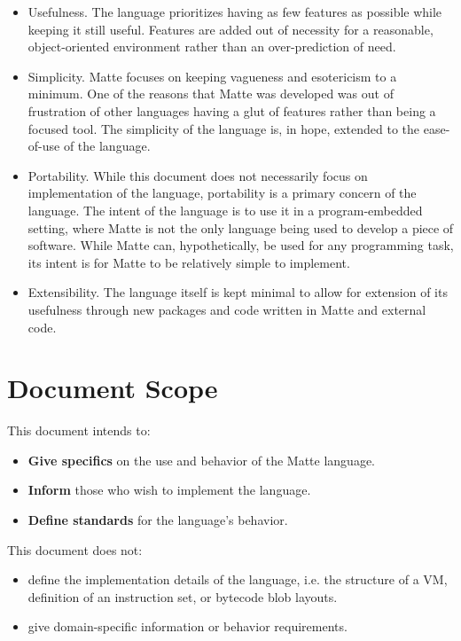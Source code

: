 \documentclass[12pt,letterpaper]{report}
\begin{document}
\begin{itemize}
\item Usefulness. The language prioritizes having as few features as possible 
  while keeping it still useful. Features are added out of necessity for a reasonable, 
  object-oriented environment rather than an over-prediction of need.

\item Simplicity. Matte focuses on keeping vagueness and esotericism to a minimum. One 
  of the reasons that Matte was developed was out of frustration of other 
  languages having a glut of features rather than being a focused tool. The 
  simplicity of the language is, in hope, extended to the ease-of-use of the language.

\item Portability. While this document does not necessarily focus on implementation 
  of the language, portability is a primary concern of the language. 
  The intent of the language is to use it in a program-embedded setting, 
  where Matte is not the only language being used to develop a piece of software. 
  While Matte can, hypothetically, be used for any programming task, its intent is 
  for Matte to be relatively simple to implement. 

\item Extensibility. The language itself is kept minimal to allow for extension of its 
  usefulness through new packages and code written in Matte and external code.
\end{itemize}

\section{Document Scope}\label{Document Scope}

This document intends to:
\begin{itemize}
\item \textbf{Give specifics} on the use and behavior of the Matte language. 
\item \textbf{Inform} those who wish to implement the language.
\item \textbf{Define standards} for the language's behavior.
\end{itemize}
This document does not:
\begin{itemize}
\item define the implementation details of the language, i.e. the 
      structure of a VM, definition of an instruction set, or bytecode blob layouts.
\item give domain-specific information or behavior requirements.
\end{itemize}
\end{document}

